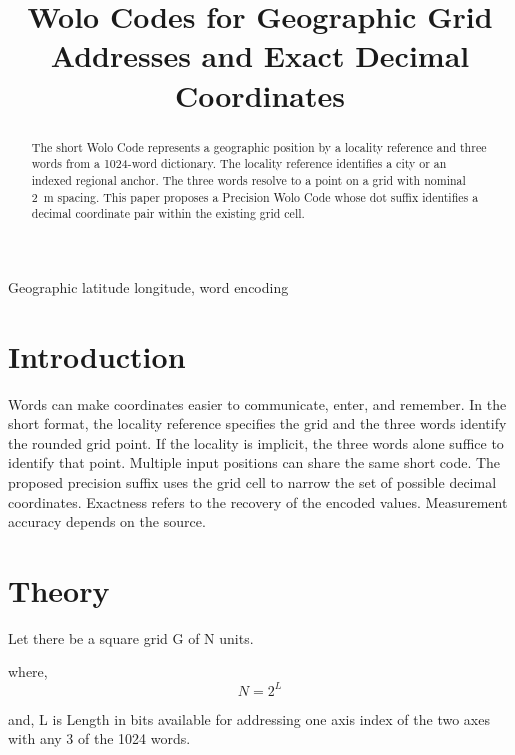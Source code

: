 \documentclass[conference]{IEEEtran}
\begin{document}
\title{Wolo Codes for Geographic Grid Addresses and Exact Decimal Coordinates}

\author{
}

\maketitle

\begin{abstract}
The short Wolo Code represents a geographic position by a locality reference and three words from a 1024-word dictionary. The locality reference identifies a city or an indexed regional anchor. The three words resolve to a point on a grid with nominal 2~m spacing. This paper proposes a Precision Wolo Code whose dot suffix identifies a decimal coordinate pair within the existing grid cell.
\end{abstract}

\begin{IEEEkeywords}
Geographic latitude longitude, word encoding
\end{IEEEkeywords}

\section{Introduction}
Words can make coordinates easier to communicate, enter, and remember. In the short format, the locality reference specifies the grid and the three words identify the rounded grid point. If the locality is implicit, the three words alone suffice to identify that point. Multiple input positions can share the same short code. The proposed precision suffix uses the grid cell to narrow the set of possible decimal coordinates. Exactness refers to the recovery of the encoded values. Measurement accuracy depends on the source.
\section{Theory}
Let there be a square grid G of N units.

where, \begin{equation}
N \label{eq:1} = 2^{L}
\end{equation}

and, L is Length in bits available for addressing one axis index of the two axes with any 3 of the 1024 words.
\end{document}
